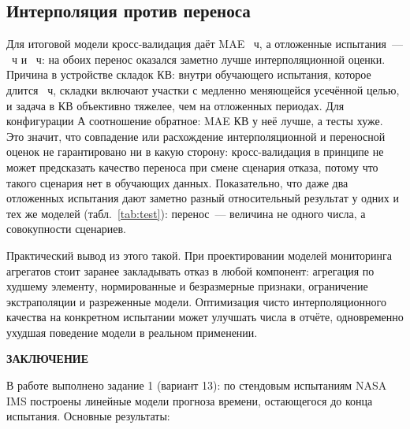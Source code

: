 \documentclass[14pt,a4paper]{extarticle}
\newcommand{\struct}[1]{%
  \clearpage
  \begin{center}\bfseries #1\end{center}%
  \addcontentsline{toc}{section}{#1}%
}
\begin{document}
\subsection{Интерполяция против переноса}

Для итоговой модели кросс-валидация даёт MAE \BestMAECV~ч, а отложенные
испытания~--- \BestMAETest~ч и \BestMAETestThree~ч: на обоих перенос оказался
заметно лучше интерполяционной оценки. Причина в устройстве складок КВ:
внутри обучающего испытания, которое длится \DurTrain~ч, складки включают
участки с медленно меняющейся усечённой целью, и задача в КВ объективно
тяжелее, чем на отложенных периодах. Для конфигурации А соотношение
обратное: MAE КВ у неё лучше, а тесты хуже. Это значит, что совпадение
или расхождение интерполяционной и переносной оценок не гарантировано
ни в какую сторону: кросс-валидация в принципе не может предсказать
качество переноса при смене сценария отказа, потому что такого сценария
нет в обучающих данных. Показательно, что даже два отложенных испытания
дают заметно разный относительный результат у одних и тех же моделей
(табл.~\ref{tab:test}): перенос~--- величина не одного числа, а
совокупности сценариев.

Практический вывод из этого такой. При проектировании моделей мониторинга
агрегатов стоит заранее закладывать отказ в любой компонент: агрегация по
худшему элементу, нормированные и безразмерные признаки, ограничение
экстраполяции и разреженные модели. Оптимизация чисто интерполяционного
качества на конкретном испытании может улучшать числа в отчёте, одновременно
ухудшая поведение модели в реальном применении.

\struct{ЗАКЛЮЧЕНИЕ}

В работе выполнено задание 1 (вариант 13): по стендовым испытаниям NASA IMS
построены линейные модели прогноза времени, остающегося до конца испытания.
Основные результаты:
\end{document}
